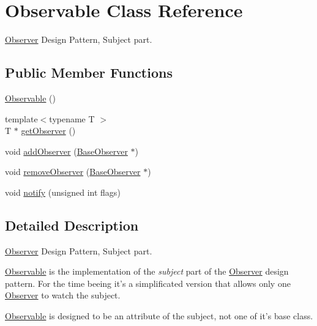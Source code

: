 \hypertarget{classKatabatic_1_1Observable}{\section{Observable Class Reference}
\label{classKatabatic_1_1Observable}
}


\hyperlink{classKatabatic_1_1Observer}{Observer} Design Pattern, Subject part.  


\subsection*{Public Member Functions}
\begin{DoxyCompactItemize}
\item 
\hyperlink{classKatabatic_1_1Observable_a6438e92e07db169a97ed3eba36788dc4}{Observable} ()
\item 
{\footnotesize template$<$typename T $>$ }\\T $\ast$ \hyperlink{classKatabatic_1_1Observable_acc0b7276e09628f2b101ecf751aacd2a}{get\-Observer} ()
\item 
void \hyperlink{classKatabatic_1_1Observable_a783fda85eeabe9c660881f236f162767}{add\-Observer} (\hyperlink{classKatabatic_1_1BaseObserver}{Base\-Observer} $\ast$)
\item 
void \hyperlink{classKatabatic_1_1Observable_acaa5a7fc7fa631e3006a42006d753f43}{remove\-Observer} (\hyperlink{classKatabatic_1_1BaseObserver}{Base\-Observer} $\ast$)
\item 
void \hyperlink{classKatabatic_1_1Observable_a52e577fb0c4f2e3650928334fb621c2f}{notify} (unsigned int flags)
\end{DoxyCompactItemize}


\subsection{Detailed Description}
\hyperlink{classKatabatic_1_1Observer}{Observer} Design Pattern, Subject part. 

\hyperlink{classKatabatic_1_1Observable}{Observable} is the implementation of the {\itshape subject} part of the \hyperlink{classKatabatic_1_1Observer}{Observer} design pattern. For the time beeing it's a simplificated version that allows only one \hyperlink{classKatabatic_1_1Observer}{Observer} to watch the subject.

\hyperlink{classKatabatic_1_1Observable}{Observable} is designed to be an attribute of the subject, not one of it's base class.

